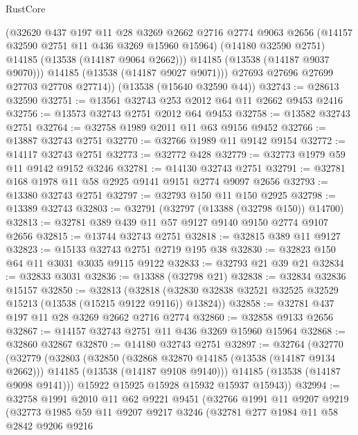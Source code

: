 \begin{lexlean}{RustCore}
\begin{coremodule}
            (@32620
              @437
              @197
              @11
              @28
              @3269
              @2662
              @2716
              @2774
              @9063
              @2656
              (@14157 @32590 @2751 @11 @436 @3269 @15960 @15964)
              (@14180 @32590 @2751)
              @14185
              (@13538 (@14187 @9064 @2662)))
            @14185
            (@13538 (@14187 @9037 @9070)))
          @14185
          (@13538 (@14187 @9027 @9071)))
        @27693
        @27696
        @27699
        @27703
        @27708
        @27714))
    (@13538 (@15640 @32590 @44))
@32743 := @28613 @32590
@32751 := @13561 @32743 @253 @2012 @64 @11 @2662 @9453 @2416
@32756 := @13573 @32743 @2751 @2012 @64 @9453
@32758 := @13582 @32743 @2751
@32764 := @32758 @1989 @2011 @11 @63 @9156 @9452
@32766 := @13887 @32743 @2751
@32770 := @32766 @1989 @11 @9142 @9154
@32772 := @14117 @32743 @2751
@32773 := @32772 @428
@32779 := @32773 @1979 @59 @11 @9142 @9152 @3246
@32781 := @14130 @32743 @2751
@32791 := @32781 @168 @1978 @11 @58 @2925 @9141 @9151 @2774 @9097 @2656
@32793 := @13380 @32743 @2751
@32797 := @32793 @150 @11 @150 @2925
@32798 := @13389 @32743
@32803 := @32791 (@32797 (@13388 (@32798 @150)) @14700)
@32813 := @32781 @389 @439 @11 @57 @9127 @9140 @9150 @2774 @9107 @2656
@32815 := @13744 @32743 @2751
@32818 := @32815 @389 @11 @9127
@32823 := @15133 @32743 @2751 @2719 @195 @38
@32830 := @32823 @150 @64 @11 @3031 @3035 @9115 @9122
@32833 := @32793 @21 @39 @21
@32834 := @32833 @3031
@32836 := @13388 (@32798 @21)
@32838 := @32834 @32836 @15157
@32850 := @32813
    (@32818 (@32830 @32838 @32521 @32525 @32529 @15213 (@13538 (@15215 @9122 @9116)) @13824))
@32858 := @32781 @437 @197 @11 @28 @3269 @2662 @2716 @2774
@32860 := @32858 @9133 @2656
@32867 := @14157 @32743 @2751 @11 @436 @3269 @15960 @15964
@32868 := @32860 @32867
@32870 := @14180 @32743 @2751
@32897 := @32764
    (@32770
      (@32779
        (@32803
          (@32850
            (@32868 @32870 @14185 (@13538 (@14187 @9134 @2662)))
            @14185
            (@13538 (@14187 @9108 @9140)))
          @14185
          (@13538 (@14187 @9098 @9141)))
        @15922
        @15925
        @15928
        @15932
        @15937
        @15943))
@32994 := @32758
    @1991
    @2010
    @11
    @62
    @9221
    @9451
    (@32766
      @1991
      @11
      @9207
      @9219
      (@32773
        @1985
        @59
        @11
        @9207
        @9217
        @3246
        (@32781
          @277
          @1984
          @11
          @58
          @2842
          @9206
          @9216

\end{coremodule}
\end{lexlean}
